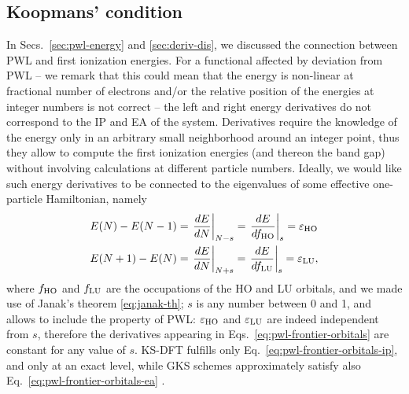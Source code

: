 \subsection{Koopmans' condition\label{sec:koopmans-condition}}
In Secs.~\ref{sec:pwl-energy} and \ref{sec:deriv-dis}, we discussed the connection between PWL and first ionization energies. For a functional affected by deviation from PWL -- we remark that this could mean that the energy is non-linear at fractional number of electrons and/or the relative position of the energies at integer numbers is not correct -- the left and right energy derivatives do not correspond to the IP and EA of the system. Derivatives require the knowledge of the energy only in an arbitrary small neighborhood around an integer point, thus they allow to compute the first ionization energies (and thereon the band gap) without involving calculations at different particle numbers. Ideally, we would like such energy derivatives to be connected to the eigenvalues of some effective one-particle Hamiltonian, namely
%
\begin{subequations}
    \begin{align}
        E(N) - E(N-1) &= \left. \frac{dE}{dN} \right|_{N-s} = \left. \frac{dE}{df_{\rm HO}} \right|_{s} = \varepsilon_{\rm HO} \label{eq:pwl-frontier-orbitals-ip}\\
        E(N+1) - E(N) &= \left. \frac{dE}{dN} \right|_{N+s} = \left. \frac{dE}{df_{\rm LU}} \right|_{s} = \varepsilon_{\rm LU} \label{eq:pwl-frontier-orbitals-ea},
    \end{align}
    \label{eq:pwl-frontier-orbitals}
\end{subequations}
%
where $f_{\rm HO}$ and $f_{\rm LU}$ are the occupations of the HO and LU orbitals, and we made use of Janak's theorem \eqref{eq:janak-th}; $s$ is any number between 0 and 1, and allows to include the property of PWL: $\varepsilon_{\rm HO}$ and $\varepsilon_{\rm LU}$ are indeed independent from $s$, therefore the derivatives appearing in Eqs.~\eqref{eq:pwl-frontier-orbitals} are constant for any value of $s$. KS-DFT fulfills only Eq.~\eqref{eq:pwl-frontier-orbitals-ip}, and only at an exact level, while GKS schemes approximately satisfy also Eq.~\eqref{eq:pwl-frontier-orbitals-ea} \cite{seidl_generalized_1996,cohen_fractional-charge_2008,stein_fundamental_2010}.

